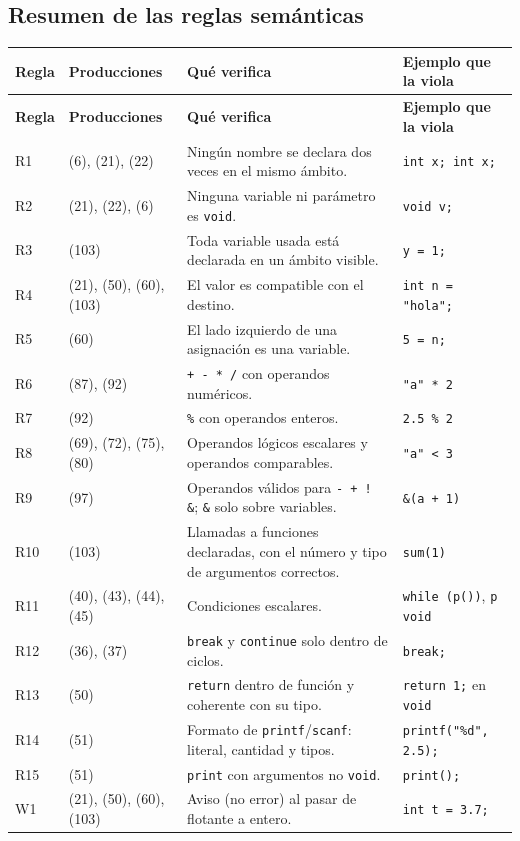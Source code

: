 \documentclass[11pt]{article}
\newcommand{\T}[1]{\textcolor{tcolor}{\texttt{#1}}}              %
\newcommand{\ty}[1]{\texttt{#1}}                                 %
\begin{document}
\subsection{Resumen de las reglas semánticas}

\begin{longtable}{@{}l >{\raggedright\arraybackslash}p{4.2cm} >{\raggedright\arraybackslash}p{6.4cm} >{\raggedright\arraybackslash}p{4.0cm}@{}}
\toprule
\textbf{Regla} & \textbf{Producciones} & \textbf{Qué verifica} & \textbf{Ejemplo que la viola} \\
\midrule
\endfirsthead
\toprule
\textbf{Regla} & \textbf{Producciones} & \textbf{Qué verifica} & \textbf{Ejemplo que la viola} \\
\midrule
\endhead
\bottomrule
\endfoot
R1 & (6), (21), (22) & Ningún nombre se declara dos veces en el mismo ámbito. & \texttt{int x; int x;} \\
R2 & (21), (22), (6) & Ninguna variable ni parámetro es \ty{void}. & \texttt{void v;} \\
R3 & (103) & Toda variable usada está declarada en un ámbito visible. & \texttt{y = 1;} \\
R4 & (21), (50), (60), (103) & El valor es compatible con el destino. & \texttt{int n = "hola";} \\
R5 & (60) & El lado izquierdo de una asignación es una variable. & \texttt{5 = n;} \\
R6 & (87), (92) & \T{+ - * /} con operandos numéricos. & \texttt{"a" * 2} \\
R7 & (92) & \T{\%} con operandos enteros. & \texttt{2.5 \% 2} \\
R8 & (69), (72), (75), (80) & Operandos lógicos escalares y operandos comparables. & \texttt{"a" < 3} \\
R9 & (97) & Operandos válidos para \T{- + ! \&}; \T{\&} solo sobre variables. & \texttt{\&(a + 1)} \\
R10 & (103) & Llamadas a funciones declaradas, con el número y tipo de argumentos correctos. & \texttt{sum(1)} \\
R11 & (40), (43), (44), (45) & Condiciones escalares. & \texttt{while (p())}, \texttt{p} \ty{void} \\
R12 & (36), (37) & \T{break} y \T{continue} solo dentro de ciclos. & \texttt{break;} \\
R13 & (50) & \T{return} dentro de función y coherente con su tipo. & \texttt{return 1;} en \ty{void} \\
R14 & (51) & Formato de \T{printf}/\T{scanf}: literal, cantidad y tipos. & \texttt{printf("\%d", 2.5);} \\
R15 & (51) & \T{print} con argumentos no \ty{void}. & \texttt{print();} \\
W1 & (21), (50), (60), (103) & Aviso (no error) al pasar de flotante a entero. & \texttt{int t = 3.7;} \\
\end{longtable}
\end{document}
